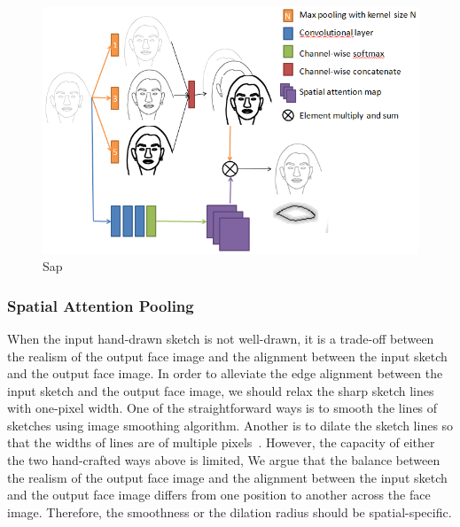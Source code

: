
% 
\begin{figure}
	\includegraphics[width=\columnwidth]{figs/sap.png}
	\caption{Sap}
	\label{fig:sap}
\end{figure}
%

\subsubsection{Spatial Attention Pooling}
When the input hand-drawn sketch is not well-drawn, it is a trade-off between the realism of the output face image and the alignment between the input sketch and the output face image.
%
In order to alleviate the edge alignment between the input sketch and the output face image, we should relax the sharp sketch lines with one-pixel width.
One of the straightforward ways is to smooth the lines of sketches using image smoothing algorithm. 
Another is to dilate the sketch lines so that the widths of lines are of multiple pixels~\cite{DeepSurgery}.
However, the capacity of either the two hand-crafted ways above is limited, 
%
We argue that the balance between the realism of the output face image and the alignment between the input sketch and the output face image differs from one position to another across the face image. Therefore, the smoothness or the dilation radius should be spatial-specific. 

